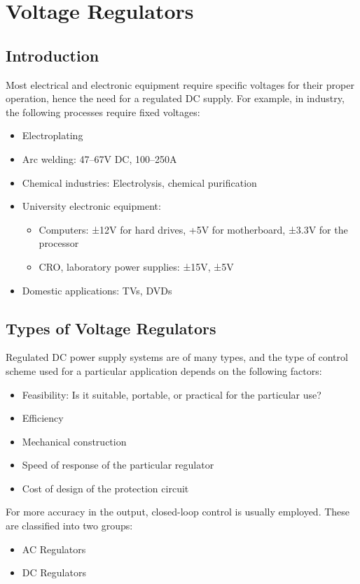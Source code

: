 \documentclass[a4paper,9pt,twoside,openany,twocolumn]{memoir}
\begin{document}
\chapter{Voltage Regulators}

\section{Introduction}
Most electrical and electronic equipment require specific voltages for their proper operation, hence the need for a regulated DC supply. For example, in industry, the following processes require fixed voltages:
\begin{itemize}
    \item Electroplating
    \item Arc welding: 47–67V DC, 100–250A
    \item Chemical industries: Electrolysis, chemical purification
    \item University electronic equipment: 
    \begin{itemize}
        \item Computers: ±12V for hard drives, +5V for motherboard, ±3.3V for the processor
        \item CRO, laboratory power supplies: ±15V, ±5V
    \end{itemize}
    \item Domestic applications: TVs, DVDs
\end{itemize}

\section{Types of Voltage Regulators}
Regulated DC power supply systems are of many types, and the type of control scheme used for a particular application depends on the following factors:
\begin{itemize}
    \item Feasibility: Is it suitable, portable, or practical for the particular use?
    \item Efficiency
    \item Mechanical construction
    \item Speed of response of the particular regulator
    \item Cost of design of the protection circuit
\end{itemize}

For more accuracy in the output, closed-loop control is usually employed. These are classified into two groups:
\begin{itemize}
    \item AC Regulators
    \item DC Regulators
\end{itemize}
\end{document}
